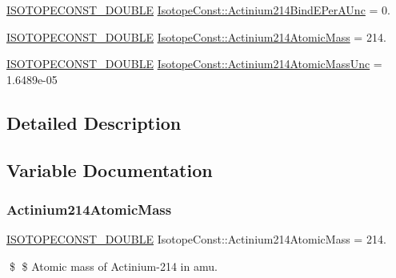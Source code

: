 \begin{DoxyCompactItemize}
\mbox{\hyperlink{group___isotope_const-_macros_ga8f45a7272ce02c0b4c65c44636ed719a}{I\+S\+O\+T\+O\+P\+E\+C\+O\+N\+S\+T\+\_\+\+D\+O\+U\+B\+LE}} \mbox{\hyperlink{group___isotope_const-_actinium-_ac214_ga99b27a4fff6cf8dd88a53a0eea346e49}{Isotope\+Const\+::\+Actinium214\+Bind\+E\+Per\+A\+Unc}} = 0.
\item 
\mbox{\hyperlink{group___isotope_const-_macros_ga8f45a7272ce02c0b4c65c44636ed719a}{I\+S\+O\+T\+O\+P\+E\+C\+O\+N\+S\+T\+\_\+\+D\+O\+U\+B\+LE}} \mbox{\hyperlink{group___isotope_const-_actinium-_ac214_ga7f95dbf37956f9143032851e282ce48e}{Isotope\+Const\+::\+Actinium214\+Atomic\+Mass}} = 214.
\item 
\mbox{\hyperlink{group___isotope_const-_macros_ga8f45a7272ce02c0b4c65c44636ed719a}{I\+S\+O\+T\+O\+P\+E\+C\+O\+N\+S\+T\+\_\+\+D\+O\+U\+B\+LE}} \mbox{\hyperlink{group___isotope_const-_actinium-_ac214_ga2acf6479ee68285dfa1f9fe91b5bc246}{Isotope\+Const\+::\+Actinium214\+Atomic\+Mass\+Unc}} = 1.\+6489e-\/05
\end{DoxyCompactItemize}


\subsection{Detailed Description}


\subsection{Variable Documentation}
\mbox{\label{group___isotope_const-_actinium-_ac214_ga7f95dbf37956f9143032851e282ce48e}} 
\subsubsection{\texorpdfstring{Actinium214\+Atomic\+Mass}{Actinium214AtomicMass}}
{\footnotesize\ttfamily \mbox{\hyperlink{group___isotope_const-_macros_ga8f45a7272ce02c0b4c65c44636ed719a}{I\+S\+O\+T\+O\+P\+E\+C\+O\+N\+S\+T\+\_\+\+D\+O\+U\+B\+LE}} Isotope\+Const\+::\+Actinium214\+Atomic\+Mass = 214.}

\$ \$ Atomic mass of Actinium-\/214 in amu. \mbox{\label{group___isotope_const-_actinium-_ac214_ga2acf6479ee68285dfa1f9fe91b5bc246}} 
